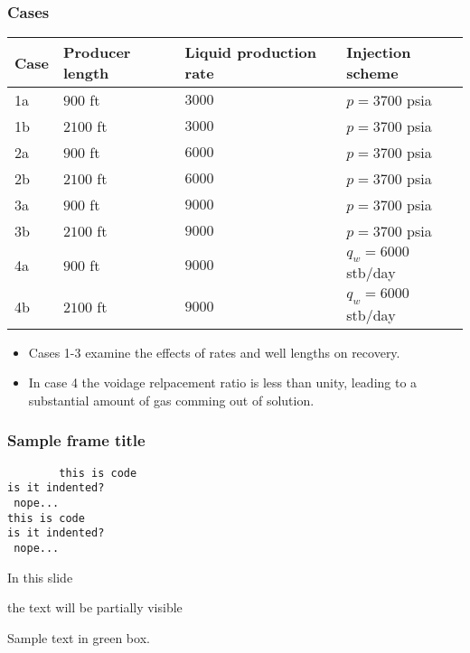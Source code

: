 \documentclass{beamer}
\begin{document}
\begin{frame}
    \frametitle{Cases}
    \footnotesize
    \begin{tabular}{llll}
        \toprule
        \textbf{Case} & \textbf{Producer length} & \textbf{Liquid production rate} & \textbf{Injection scheme} \\
        \midrule
        1a            & $900$ ft                   & $3000$                          & $p = 3700$ psia           \\
        1b            & $2100$ ft                  & $3000$                          & $p = 3700$ psia           \\
        2a            & $900$ ft                   & $6000$                          & $p = 3700$ psia           \\
        2b            & $2100$ ft                  & $6000$                          & $p = 3700$ psia           \\
        3a            & $900$ ft                   & $9000$                          & $p = 3700$ psia           \\
        3b            & $2100$ ft                  & $9000$                          & $p = 3700$ psia           \\
        4a            & $900$ ft                   & $9000$                          & $q_w = 6000$ stb/day      \\
        4b            & $2100$ ft                  & $9000$                          & $q_w = 6000$ stb/day      \\
        \bottomrule
    \end{tabular}
    \normalsize
    \begin{itemize}
        \item Cases 1-3 examine the effects of rates and well lengths on recovery.
        \item In case 4 the voidage relpacement ratio is less than unity, leading to a substantial amount of gas comming out of solution.
    \end{itemize}
\end{frame}

\begin{frame}[fragile]
	\frametitle{Sample frame title}
	\begin{code}
        \begin{verbatim}
        this is code
is it indented?
 nope...
this is code
is it indented?
 nope...
        \end{verbatim}
    \end{code}
\end{frame}

\begin{frame}
 In this slide \pause
 
 the text will be partially visible
\end{frame}


\begin{frame}
	\begin{remark}
		Sample text in green box.
	\end{remark}
\end{frame}
 
\end{document}
